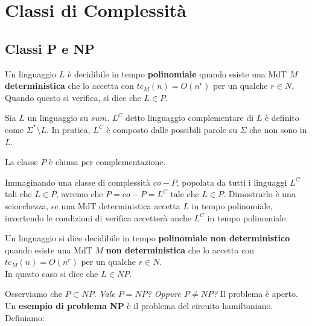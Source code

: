 \section{Classi di Complessità}

\subsection{Classi P e NP}

\begin{defn}[Classe P]
	Un linguaggio $L$ è decidibile in tempo \textbf{polinomiale} quando esiste una MdT $M$ \textbf{deterministica} che lo accetta con $tc_M(n) = O(n^r)$ per un qualche $r \in N$. \\ Quando questo si verifica, si dice che $L \in P$.
\end{defn}

\vspace{0.25cm}

Sia $L$ un linguaggio su $sum$. $L^C$ detto linguaggio complementare di $L$ è definito come $\Sigma^\ast \setminus L$. In pratica, $L^C$ è composto dalle possibili parole su $\Sigma$ che non sono in $L$. \\

\begin{remark}
	La classe $P$ è chiusa per complementazione.
\end{remark}

Immaginando una classe di complessità $co-P$, popolata da tutti i linguaggi $L^C$ tali che $L \in P$, avremo che $P = co-P = {L^C \text{ tale che } L \in P}$. Dimostrarlo è una sciocchezza, se una MdT deterministica accetta $L$ in tempo polinomiale, invertendo le condizioni di verifica accetterà anche $L^C$ in tempo polinomiale. \\

\begin{defn}[Classe NP]
	Un linguaggio si dice decidibile in tempo \textbf{polinomiale non deterministico} quando esiste una MdT $M$ \textbf{non deterministica} che lo accetta con $tc_M(n) = O(n^r)$ per un qualche $r \in N$. \\ In questo caso si dice che $L \in NP$.
\end{defn}

Osserviamo che $P \subset NP$. \textit{Vale $P = NP$? Oppure $P \neq NP$?} Il problema è aperto. \\

Un \textbf{esempio di problema NP} è il problema del circuito hamiltoniano. Definiamo:

